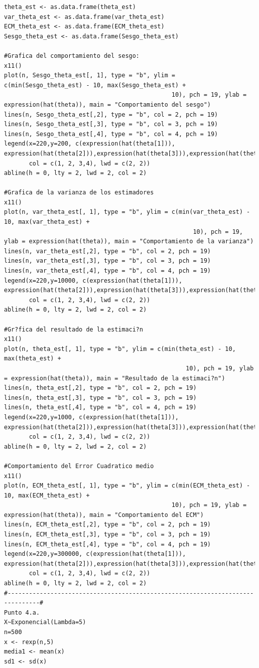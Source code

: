 \documentclass[letterpaper,12pt,onecolumn,titlepage]{article}
\begin{document}
\begin{verbatim}
theta_est <- as.data.frame(theta_est)
var_theta_est <- as.data.frame(var_theta_est)
ECM_theta_est <- as.data.frame(ECM_theta_est)
Sesgo_theta_est <- as.data.frame(Sesgo_theta_est)

#Grafica del comportamiento del sesgo:
x11()
plot(n, Sesgo_theta_est[, 1], type = "b", ylim = c(min(Sesgo_theta_est) - 10, max(Sesgo_theta_est) + 
                                               10), pch = 19, ylab = expression(hat(theta)), main = "Comportamiento del sesgo")
lines(n, Sesgo_theta_est[,2], type = "b", col = 2, pch = 19)
lines(n, Sesgo_theta_est[,3], type = "b", col = 3, pch = 19)
lines(n, Sesgo_theta_est[,4], type = "b", col = 4, pch = 19)
legend(x=220,y=200, c(expression(hat(theta[1])), expression(hat(theta[2])),expression(hat(theta[3])),expression(hat(theta[4]))), 
       col = c(1, 2, 3,4), lwd = c(2, 2))
abline(h = 0, lty = 2, lwd = 2, col = 2)

#Grafica de la varianza de los estimadores
x11()
plot(n, var_theta_est[, 1], type = "b", ylim = c(min(var_theta_est) - 10, max(var_theta_est) + 
                                                     10), pch = 19, ylab = expression(hat(theta)), main = "Comportamiento de la varianza")
lines(n, var_theta_est[,2], type = "b", col = 2, pch = 19)
lines(n, var_theta_est[,3], type = "b", col = 3, pch = 19)
lines(n, var_theta_est[,4], type = "b", col = 4, pch = 19)
legend(x=220,y=10000, c(expression(hat(theta[1])), expression(hat(theta[2])),expression(hat(theta[3])),expression(hat(theta[4]))), 
       col = c(1, 2, 3,4), lwd = c(2, 2))
abline(h = 0, lty = 2, lwd = 2, col = 2)

#Gr?fica del resultado de la estimaci?n
x11()
plot(n, theta_est[, 1], type = "b", ylim = c(min(theta_est) - 10, max(theta_est) + 
                                                   10), pch = 19, ylab = expression(hat(theta)), main = "Resultado de la estimaci?n")
lines(n, theta_est[,2], type = "b", col = 2, pch = 19)
lines(n, theta_est[,3], type = "b", col = 3, pch = 19)
lines(n, theta_est[,4], type = "b", col = 4, pch = 19)
legend(x=220,y=1000, c(expression(hat(theta[1])), expression(hat(theta[2])),expression(hat(theta[3])),expression(hat(theta[4]))), 
       col = c(1, 2, 3,4), lwd = c(2, 2))
abline(h = 0, lty = 2, lwd = 2, col = 2)

#Comportamiento del Error Cuadratico medio
x11()
plot(n, ECM_theta_est[, 1], type = "b", ylim = c(min(ECM_theta_est) - 10, max(ECM_theta_est) + 
                                               10), pch = 19, ylab = expression(hat(theta)), main = "Comportamiento del ECM")
lines(n, ECM_theta_est[,2], type = "b", col = 2, pch = 19)
lines(n, ECM_theta_est[,3], type = "b", col = 3, pch = 19)
lines(n, ECM_theta_est[,4], type = "b", col = 4, pch = 19)
legend(x=220,y=300000, c(expression(hat(theta[1])), expression(hat(theta[2])),expression(hat(theta[3])),expression(hat(theta[4]))), 
       col = c(1, 2, 3,4), lwd = c(2, 2))
abline(h = 0, lty = 2, lwd = 2, col = 2)
#-------------------------------------------------------------------------------#
Punto 4.a.
X~Exponencial(Lambda=5)
n=500
x <- rexp(n,5)
media1 <- mean(x)
sd1 <- sd(x)


\end{verbatim}
\end{document}
